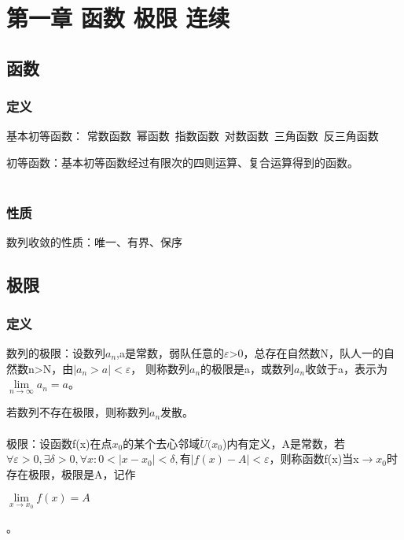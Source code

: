 \documentclass{ctexart}
\begin{document}

\tableofcontents
\newpage


\section{第一章 函数 极限 连续}
\subsection{函数}
\subsubsection{定义}
基本初等函数：
常数函数\ 幂函数\ 指数函数\ 对数函数\ 三角函数\ 反三角函数

初等函数：基本初等函数经过有限次的四则运算、复合运算得到的函数。
\\\\

\subsubsection{性质}

数列收敛的性质：唯一、有界、保序

\subsection{极限}
\subsubsection{定义}
数列的极限：设数列${a_n}$,a是常数，弱队任意的$\varepsilon$>0，总存在自然数N，队人一的自然数n>N，由$|a_n>a|<\varepsilon$，
则称数列${a_n}$的极限是a，或数列${a_n}$收敛于a，表示为$\lim\limits_{n \rightarrow \infty}a_n = a$。

若数列不存在极限，则称数列${a_n}$发散。
\\\\

极限：设函数f(x)在点$x_0$的某个去心邻域$\mathring{U}(x_0$)内有定义，A是常数，若$\forall \varepsilon > 0,\exists \delta >0,\forall x: 0<|x-x_0|<\delta,有|f(x)-A|<\varepsilon$，则称函数f(x)当x$\rightarrow x_0$时存在极限，极限是A，记作
\begin{center}
$\lim\limits_{x \rightarrow x_0} f(x)=A$\\
\end{center}。
\\\\
\end{document}
